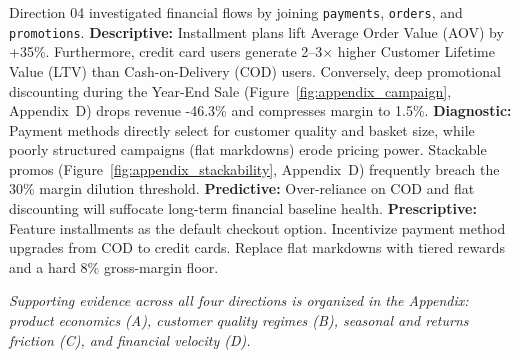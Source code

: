 Direction 04 investigated financial flows by joining \texttt{payments}, \texttt{orders}, and \texttt{promotions}.
\textbf{Descriptive:} Installment plans lift Average Order Value (AOV) by +35\%. Furthermore, credit card users generate 2--3$\times$ higher Customer Lifetime Value (LTV) than Cash-on-Delivery (COD) users. Conversely, deep promotional discounting during the Year-End Sale (Figure~\ref{fig:appendix_campaign}, Appendix~D) drops revenue -46.3\% and compresses margin to 1.5\%.
\textbf{Diagnostic:} Payment methods directly select for customer quality and basket size, while poorly structured campaigns (flat markdowns) erode pricing power. Stackable promos (Figure~\ref{fig:appendix_stackability}, Appendix~D) frequently breach the 30\% margin dilution threshold.
\textbf{Predictive:} Over-reliance on COD and flat discounting will suffocate long-term financial baseline health.
\textbf{Prescriptive:} Feature installments as the default checkout option. Incentivize payment method upgrades from COD to credit cards. Replace flat markdowns with tiered rewards and a hard 8\% gross-margin floor.

\FloatBarrier

\vspace{0.3cm}
\textit{Supporting evidence across all four directions is organized in the Appendix: product economics (A), customer quality regimes (B), seasonal and returns friction (C), and financial velocity (D).}
